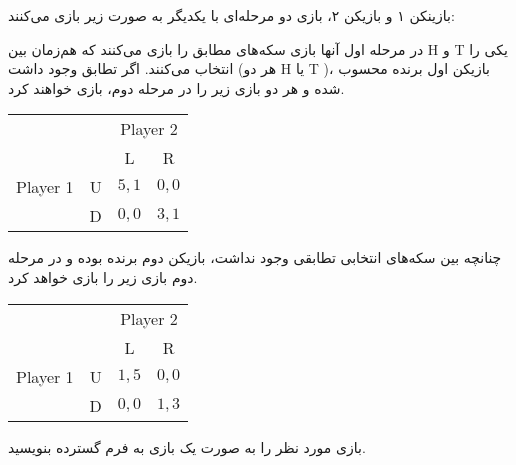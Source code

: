 بازینکن ۱ و بازیکن ۲، بازی دو مرحله‌ا‌ی با یکدیگر به صورت زیر بازی می‌کنند:

در مرحله اول آنها بازی سکه‌های مطابق را بازی‌ می‌کنند که هم‌زمان بین
H
و
T
یکی را انتخاب می‌کنند. اگر تطابق وجود داشت (هر دو H یا T )، بازیکن اول برنده محسوب شده و هر دو بازی زیر را در مرحله دوم، بازی خواهند کرد.
\LTR 
\begin{latin}
    \begin{center}
        \begin{tabular}{r  c | c | c |}
            \multicolumn{2}{r}{} &
            \multicolumn{2}{c}{Player 2} \\
            \multicolumn{1}{r}{} &
            \multicolumn{1}{c}{} &
            \multicolumn{1}{c}{L} &
            \multicolumn{1}{c}{R} \\ \cline{3-4}
            Player 1  & U       & $5,1$     & $0,0$  \\ \cline{3-4}
                      & D       & $0,0$     & $3,1$ \\ \cline{3-4}
        \end{tabular}
    \end{center}
\end{latin}
\RTL
چنانچه بین سکه‌های انتخابی تطابقی وجود نداشت، بازیکن دوم برنده بوده و در مرحله دوم بازی زیر را بازی خواهد کرد.
\LTR 
\begin{latin}
    \begin{center}
        \begin{tabular}{r  c | c | c |}
            \multicolumn{2}{r}{} &
            \multicolumn{2}{c}{Player 2} \\
            \multicolumn{1}{r}{} &
            \multicolumn{1}{c}{} &
            \multicolumn{1}{c}{L} &
            \multicolumn{1}{c}{R} \\ \cline{3-4}
            Player 1  & U       & $1,5$     & $0,0$  \\ \cline{3-4}
                      & D       & $0,0$     & $1,3$ \\ \cline{3-4}
        \end{tabular}
    \end{center}
\end{latin}
\RTL
بازی مورد نظر را به صورت یک بازی به فرم گسترده بنویسید.